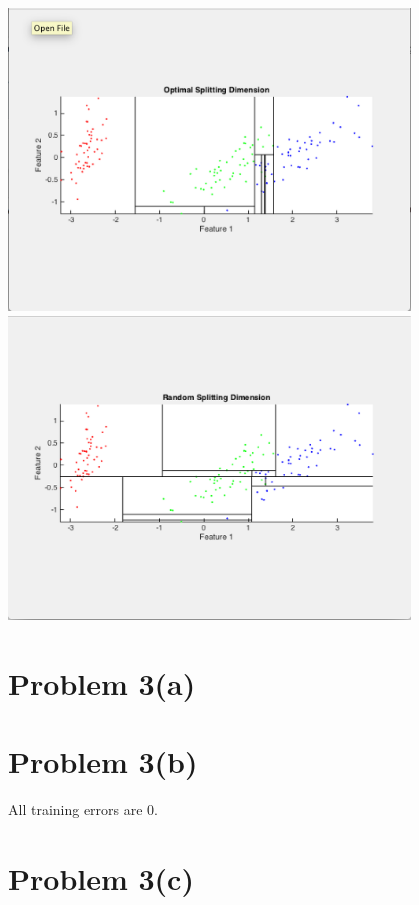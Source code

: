 \documentclass{article}
\begin{document}
\begin{center}
\includegraphics[width=0.8\textwidth]{2b_optimal_splitting_dimension.png}
\includegraphics[width=0.8\textwidth]{2b_random_splitting_dimension.png}
\end{center}

\section*{Problem 3(a)}


\section*{Problem 3(b)}


All training errors are 0.

\section*{Problem 3(c)}
\end{document}

